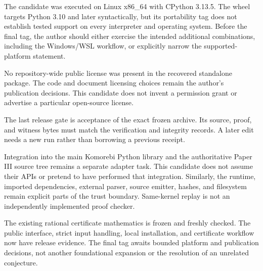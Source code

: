 The candidate was executed on Linux x86\_64 with CPython 3.13.5. The wheel targets Python 3.10 and later syntactically, but its portability tag does not establish tested support on every interpreter and operating system. Before the final tag, the author should either exercise the intended additional combinations, including the Windows/WSL workflow, or explicitly narrow the supported-platform statement.

No repository-wide public license was present in the recovered standalone package. The code and document licensing choices remain the author's publication decisions. This candidate does not invent a permission grant or advertise a particular open-source license.

The last release gate is acceptance of the exact frozen archive. Its source, proof, and witness bytes must match the verification and integrity records. A later edit needs a new run rather than borrowing a previous receipt.

Integration into the main Komorebi Python library and the authoritative Paper III source tree remains a separate adapter task. This candidate does not assume their APIs or pretend to have performed that integration. Similarly, the runtime, imported dependencies, external parser, source emitter, hashes, and filesystem remain explicit parts of the trust boundary. Same-kernel replay is not an independently implemented proof checker.

\begin{scopebox}[title=What is ready and what remains]
The existing rational certificate mathematics is frozen and freshly checked. The public interface, strict input handling, local installation, and certificate workflow now have release evidence. The final tag awaits bounded platform and publication decisions, not another foundational expansion or the resolution of an unrelated conjecture.
\end{scopebox}
